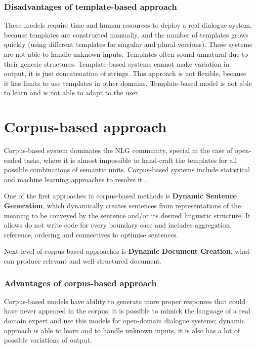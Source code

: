 \subsubsection{Disadvantages of template-based approach}
These models require time and human resources to deploy a real dialogue system, because templates are constructed manually, and the number of templates grows quickly (using different templates for singular and plural versions). These systems are not able to handle unknown inputs. Templates often sound unnatural due to their generic structures. Template-based systems cannot make variation in output, it is just concatenation of strings. This approach is not flexible, because it has limits to use templates in other domains. Template-based model is not able to learn and is not able to adapt to the user.

\section{Corpus-based approach}
Corpus-based system dominates the NLG community, special in the case of open-ended tasks, where it is almost impossible to hand-craft the templates for all possible combinations of semantic units. Corpus-based systems include statistical and machine learning approaches to resolve it \cite{rudnicky2002dialog}.

One of the first approaches in corpus-based methods is \textbf{Dynamic Sentence Generation}, which dynamically creates sentences from representations of the meaning to be conveyed by the sentence and/or its desired linguistic structure. It allows do not write code for every boundary case and includes aggregation, reference, ordering and connectives to optimise sentences.

Next level of corpus-based approaches is \textbf{Dynamic Document Creation}, what can produce relevant and well-structured document. 

\subsubsection{Advantages of corpus-based approach}
Corpus-based models have ability to generate more proper responses that could have never appeared in the corpus; it is possible to mimick the language of a real domain expert and use this models for open-domain dialogue systems; dynamic approach is able to learn and to handle unknown inputs, it is also has a lot of possible variations of output.

